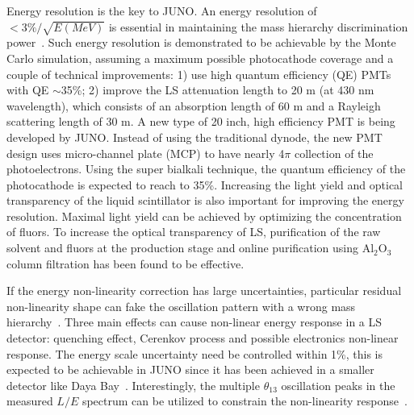 Energy resolution is the key to JUNO. An energy resolution of $<3\%/\sqrt{E(MeV)}$ is essential in maintaining the mass hierarchy discrimination power~\cite{Li-PRD13}. Such energy resolution is demonstrated to be achievable by the Monte Carlo simulation, assuming a maximum possible photocathode coverage and a couple of technical improvements: 1) use high quantum efficiency (QE) PMTs with QE $\sim$35\%; 2) improve the LS attenuation length to 20 m (at 430 nm wavelength), which consists of an absorption length of 60 m and a Rayleigh scattering length of 30 m. A new type of 20 inch, high efficiency PMT is being developed by JUNO. Instead of using the traditional dynode, the new PMT design uses micro-channel plate (MCP) to have nearly 4$\pi$ collection of the photoelectrons. Using the super bialkali technique, the quantum efficiency of the photocathode is expected to reach to 35\%. Increasing the light yield and optical transparency of the liquid scintillator is also important for improving the energy resolution. Maximal light yield can be achieved by optimizing the concentration of fluors. To increase the optical transparency of LS, purification of the raw solvent and fluors at the production stage and online purification using Al$_2$O$_3$ column filtration has been found to be effective.


If the energy non-linearity correction has large uncertainties, particular residual non-linearity shape can fake the oscillation pattern with a wrong mass hierarchy~\cite{Qian-PRD13}. Three main effects can cause non-linear energy response in a LS detector: quenching effect, Cerenkov process and possible electronics non-linear response. The energy scale uncertainty need be controlled within 1\%, this is expected to be achievable in JUNO since it has been achieved in a smaller detector like Daya Bay~\cite{Zhang-Neutrino14}. Interestingly, the multiple $\theta_{13}$ oscillation peaks in the measured $L/E$ spectrum can be utilized to constrain the non-linearity response~\cite{Li-PRD13}.


